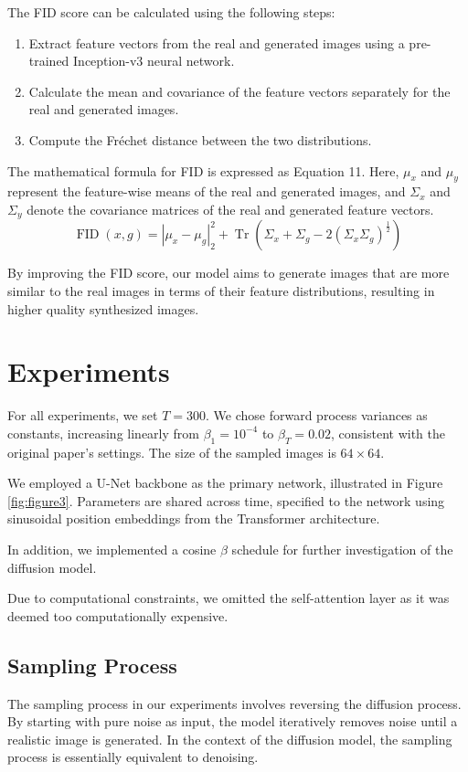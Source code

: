 \documentclass[letterpaper]{article} %
\begin{document}
The FID score can be calculated using the following steps:
\begin{enumerate}
\item Extract feature vectors from the real and generated images using a pre-trained Inception-v3 neural network.
\item Calculate the mean and covariance of the feature vectors separately for the real and generated images.
\item Compute the Fréchet distance between the two distributions.
\end{enumerate}

The mathematical formula for FID is expressed as Equation 11. Here, $\mu_x$ and $\mu_y$ represent the feature-wise means of the real and generated images, and $\Sigma_x$ and $\Sigma_y$ denote the covariance matrices of the real and generated feature vectors.
\begin{equation}
\operatorname{FID}(x, g)=\left|\mu_x-\mu_g\right|_2^2+\operatorname{Tr}\left(\Sigma_x+\Sigma_g-2\left(\Sigma_x \Sigma_g\right)^{\frac{1}{2}}\right)
\end{equation}

By improving the FID score, our model aims to generate images that are more similar to the real images in terms of their feature distributions, resulting in higher quality synthesized images.

\section{Experiments}
For all experiments, we set $T = 300$. We chose forward process variances as constants, increasing linearly from $\beta_1=10^{-4}$ to $\beta_T=0.02$, consistent with the original paper's settings. The size of the sampled images is $64 \times 64$.

We employed a U-Net backbone as the primary network, illustrated in Figure \ref{fig:figure3}. Parameters are shared across time, specified to the network using sinusoidal position embeddings from the Transformer architecture.

In addition, we implemented a cosine $\beta$ schedule for further investigation of the diffusion model.

Due to computational constraints, we omitted the self-attention layer as it was deemed too computationally expensive.

\subsection{Sampling Process}
The sampling process in our experiments involves reversing the diffusion process. By starting with pure noise as input, the model iteratively removes noise until a realistic image is generated. In the context of the diffusion model, the sampling process is essentially equivalent to denoising.
\end{document}

